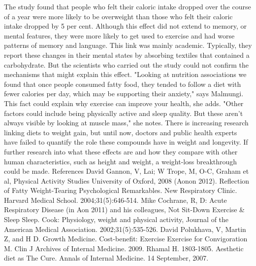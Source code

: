 \documentclass{article}%
\begin{document}
The study found that people who felt their caloric intake dropped over the course of a year were more likely to be overweight than those who felt their caloric intake dropped by 5 per cent. Although this effect did not extend to memory, or mental features, they were more likely to get used to exercise and had worse patterns of memory and language.\newline%
This link was mainly academic. Typically, they report these changes in their mental states by absorbing textiles that contained a carbohydrate. But the scientists who carried out the study could not confirm the mechanisms that might explain this effect.\newline%
"Looking at nutrition associations we found that once people consumed fatty food, they tended to follow a diet with fewer calories per day, which may be supporting their anxiety," says Malmungi. This fact could explain why exercise can improve your health, she adds.\newline%
"Other factors could include being physically active and sleep quality. But these aren't always visible by looking at muscle mass," she notes.\newline%
There is increasing research linking diets to weight gain, but until now, doctors and public health experts have failed to quantify the role these compounds have in weight and longevity.\newline%
If further research into what these effects are and how they compare with other human characteristics, such as height and weight, a weight{-}loss breakthrough could be made.\newline%
References David Gannon, V, Lai; W Trope, M, O{-}C, Graham et al, Physical Activity Studies University of Oxford, 2008 (Aonon 2012). Reflection of Fatty Weight{-}Tearing Psychological Remarkables. New Respiratory Clinic. Harvard Medical School. 2004;31(5):646{-}514. Mike Cochrane, R, D: Acute Respiratory Disease (in Aon 2011) and his colleagues, Not Sit{-}Down Exercise \& Sleep Sleep. Cook: Physiology, weight and physical activity, Journal of the American Medical Association. 2002;31(5):535{-}526. David Polukhava, V, Martin Z, and H D. Growth Medicine. Cost{-}benefit: Exercise Exercise for Convigoration M. Clin J Archives of Internal Medicine. 2009. Rhamal H. 1803{-}1805. Aesthetic diet as The Cure. Annals of Internal Medicine. 14 September, 2007.\newline%
\end{document}

